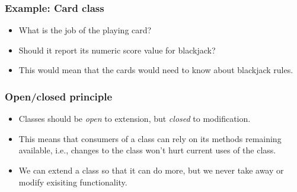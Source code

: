 \documentclass[10pt]{beamer}
\begin{document}
\begin{frame}
	\frametitle{Example: Card class}
	\begin{itemize}
		\item What is the job of the playing card?
		\item Should it report its numeric score value for blackjack?
		\item This would mean that the cards would need to
			know about blackjack rules.
	\end{itemize}
\end{frame}

\begin{frame}
	\frametitle{Open/closed principle}
	\begin{itemize}
		\item Classes should be \emph{open} to extension, but \emph{closed} 
			to modification.
		\item This means that consumers of a class can rely on its
			methods remaining available, i.e., changes to the class
			won't hurt current uses of the class.
		\item We can extend a class so that it can do more, but we never
			take away or modify exisiting functionality.
	\end{itemize}
\end{frame}
\end{document}
